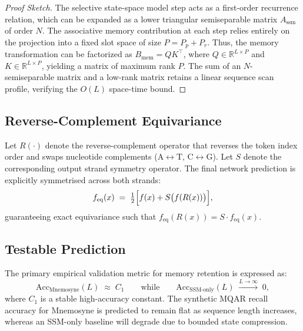 \documentclass[11pt,a4paper]{article}
\begin{document}
\begin{proof}[Proof Sketch]
The selective state-space model step acts as a first-order recurrence relation, which can be expanded as a lower triangular semiseparable matrix $A_{\mathrm{ssm}}$ of order $N$. The associative memory contribution at each step relies entirely on the projection into a fixed slot space of size $P = P_p + P_r$. Thus, the memory transformation can be factorized as $B_{\mathrm{mem}} = Q K^\top$, where $Q \in \mathbb{R}^{L \times P}$ and $K \in \mathbb{R}^{L \times P}$, yielding a matrix of maximum rank $P$. The sum of an $N$-semiseparable matrix and a low-rank matrix retains a linear sequence scan profile, verifying the $O(L)$ space-time bound.
\end{proof}

\subsection{Reverse-Complement Equivariance}
Let $R(\cdot)$ denote the reverse-complement operator that reverses the token index order and swaps nucleotide complements ($\mathrm{A} \leftrightarrow \mathrm{T}$, $\mathrm{C} \leftrightarrow \mathrm{G}$). Let $S$ denote the corresponding output strand symmetry operator. The final network prediction is explicitly symmetrised across both strands:
\begin{equation}
f_{\mathrm{eq}}(x) \;=\; \tfrac{1}{2}\Bigl[f(x) + S\bigl(f(R(x))\bigr)\Bigr],
\label{eq:rc}
\end{equation}
guaranteeing exact equivariance such that $f_{\mathrm{eq}}(R(x)) = S \cdot f_{\mathrm{eq}}(x)$.

\subsection{Testable Prediction}
The primary empirical validation metric for memory retention is expressed as:
\begin{equation}
\mathrm{Acc}_{\mathrm{Mnemosyne}}(L) \;\approx\; C_1 \qquad\text{while}\qquad \mathrm{Acc}_{\mathrm{SSM\text{-}only}}(L) \;\xrightarrow{L \to \infty}\; 0,
\label{eq:prediction}
\end{equation}
where $C_1$ is a stable high-accuracy constant. The synthetic MQAR recall accuracy for Mnemosyne is predicted to remain flat as sequence length increases, whereas an SSM-only baseline will degrade due to bounded state compression.

\newpage
\end{document}
